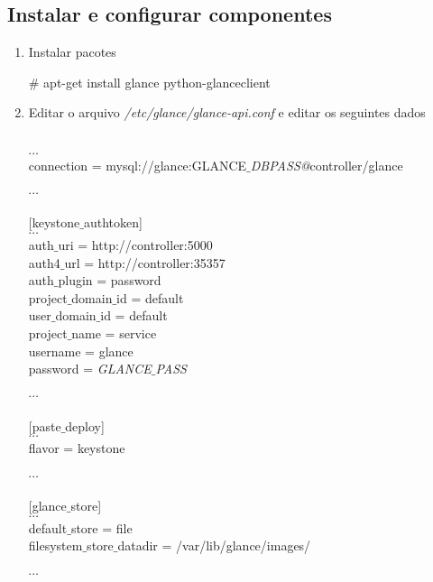 	\subsection{Instalar e configurar componentes}
	\begin{enumerate}
		\item Instalar pacotes
			\begin{snugshade}
				\# apt-get install glance python-glanceclient
			\end{snugshade}
		
		\item Editar o arquivo \emph{/etc/glance/glance-api.conf} e editar os seguintes dados
			\begin{snugshade}
				[database] \\
				$\cdots$ \\
				connection = mysql://glance:GLANCE$\_$\emph{DBPASS@}controller/glance \\ \\
				$\cdots$ \\ \\
				
				[keystone$\_$authtoken] \\
				$\cdots$ \\
				auth$\_$uri = http://controller:5000 \\
				auth4$\_$url = http://controller:35357 \\
				auth$\_$plugin = password \\
				project$\_$domain$\_$id = default \\
				user$\_$domain$\_$id = default \\
				project$\_$name = service \\				
				username = glance \\
				password = \emph{GLANCE$\_$PASS}\\ \\
				$\cdots$ \\ \\
				
				[paste$\_$deploy]\\
				$\cdots$ \\
				flavor = keystone \\ \\
				$\cdots$ \\ \\
				
				[glance$\_$store] \\
				$\cdots$ \\
				default$\_$store = file \\
				filesystem$\_$store$\_$datadir = /var/lib/glance/images/ \\ \\
				$\cdots$ \\ \\				
				

\end{snugshade}
\end{enumerate}

